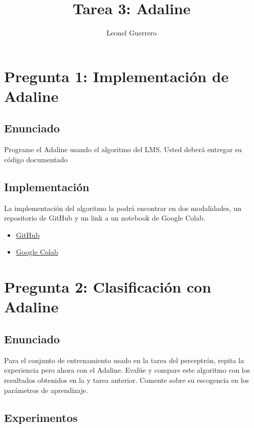 \documentclass{article}
\title{Tarea 3: Adaline}
\author{Leonel Guerrero}
\theoremstyle{mytheoremstyle}
\theoremstyle{mytheoremstyle}
\theoremstyle{myproblemstyle}
\begin{document}
\maketitle

\section*{Pregunta 1: Implementación de Adaline}

\subsection*{Enunciado}

Programe el Adaline usando el algoritmo del LMS. Usted deberá entregar su código documentado

\subsection*{Implementación}

La implementación del algoritmo la podrá encontrar en dos modalidades, un repositorio de GitHub y un link a un notebook de Google Colab.

\begin{itemize}
  \item \href{https://github.com/LeoGCode/Tarea-2--Perceptron/tree/master}{GitHub}
  \item \href{https://colab.research.google.com/drive/19HIDV-svO55OROQ8nh3c4EpypbrmDVmw?authuser=1#scrollTo=RFcFA9MZ0MEW}{Google Colab}
\end{itemize}

\section*{Pregunta 2: Clasificación con Adaline}

\subsection*{Enunciado}

Para el conjunto de entrenamiento usado en la tarea del perceptrón, repita la experiencia pero ahora con el Adaline. Evalúe y compare este algoritmo con los resultados obtenidos en la y tarea anterior. Comente sobre su escogencia en los parámetros de aprendizaje.

\subsection*{Experimentos}
\end{document}
